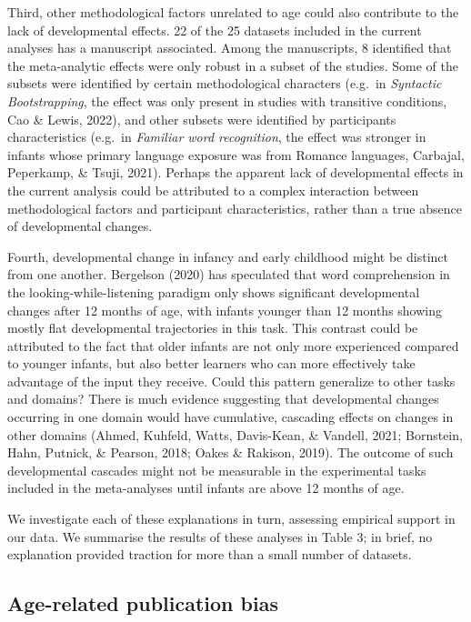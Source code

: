 \documentclass[
  man]{apa6}
\begin{document}
Third, other methodological factors unrelated to age could also contribute to the lack of developmental effects. 22 of the 25 datasets included in the current analyses has a manuscript associated. Among the manuscripts, 8 identified that the meta-analytic effects were only robust in a subset of the studies. Some of the subsets were identified by certain methodological characters (e.g.~in \emph{Syntactic Bootstrapping}, the effect was only present in studies with transitive conditions, Cao \& Lewis, 2022), and other subsets were identified by participants characteristics (e.g.~in \emph{Familiar word recognition}, the effect was stronger in infants whose primary language exposure was from Romance languages, Carbajal, Peperkamp, \& Tsuji, 2021). Perhaps the apparent lack of developmental effects in the current analysis could be attributed to a complex interaction between methodological factors and participant characteristics, rather than a true absence of developmental changes.

Fourth, developmental change in infancy and early childhood might be distinct from one another. Bergelson (2020) has speculated that word comprehension in the looking-while-listening paradigm only shows significant developmental changes after 12 months of age, with infants younger than 12 months showing mostly flat developmental trajectories in this task. This contrast could be attributed to the fact that older infants are not only more experienced compared to younger infants, but also better learners who can more effectively take advantage of the input they receive. Could this pattern generalize to other tasks and domains? There is much evidence suggesting that developmental changes occurring in one domain would have cumulative, cascading effects on changes in other domains (Ahmed, Kuhfeld, Watts, Davis-Kean, \& Vandell, 2021; Bornstein, Hahn, Putnick, \& Pearson, 2018; Oakes \& Rakison, 2019). The outcome of such developmental cascades might not be measurable in the experimental tasks included in the meta-analyses until infants are above 12 months of age.

We investigate each of these explanations in turn, assessing empirical support in our data. We summarise the results of these analyses in Table 3; in brief, no explanation provided traction for more than a small number of datasets.

\hypertarget{age-related-publication-bias}{%
\subsection{Age-related publication bias}\label{age-related-publication-bias}}
\end{document}

